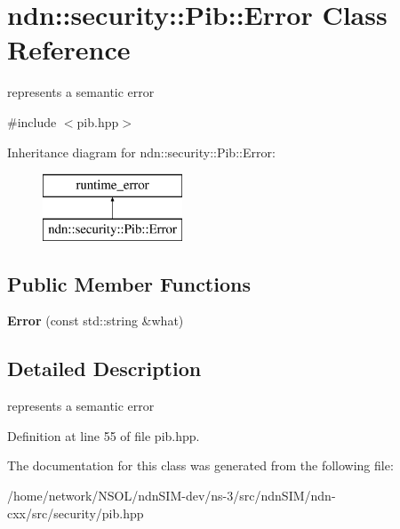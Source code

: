 \hypertarget{classndn_1_1security_1_1Pib_1_1Error}{}\section{ndn\+:\+:security\+:\+:Pib\+:\+:Error Class Reference}
\label{classndn_1_1security_1_1Pib_1_1Error}


represents a semantic error  




{\ttfamily \#include $<$pib.\+hpp$>$}

Inheritance diagram for ndn\+:\+:security\+:\+:Pib\+:\+:Error\+:\begin{figure}[H]
\begin{center}
\leavevmode
\includegraphics[height=2.000000cm]{classndn_1_1security_1_1Pib_1_1Error}
\end{center}
\end{figure}
\subsection*{Public Member Functions}
\begin{DoxyCompactItemize}
\item 
{\bfseries Error} (const std\+::string \&what)\hypertarget{classndn_1_1security_1_1Pib_1_1Error_a8e2600fc757e3023415969437c26f6db}{}\label{classndn_1_1security_1_1Pib_1_1Error_a8e2600fc757e3023415969437c26f6db}

\end{DoxyCompactItemize}


\subsection{Detailed Description}
represents a semantic error 

Definition at line 55 of file pib.\+hpp.



The documentation for this class was generated from the following file\+:\begin{DoxyCompactItemize}
\item 
/home/network/\+N\+S\+O\+L/ndn\+S\+I\+M-\/dev/ns-\/3/src/ndn\+S\+I\+M/ndn-\/cxx/src/security/pib.\+hpp\end{DoxyCompactItemize}
